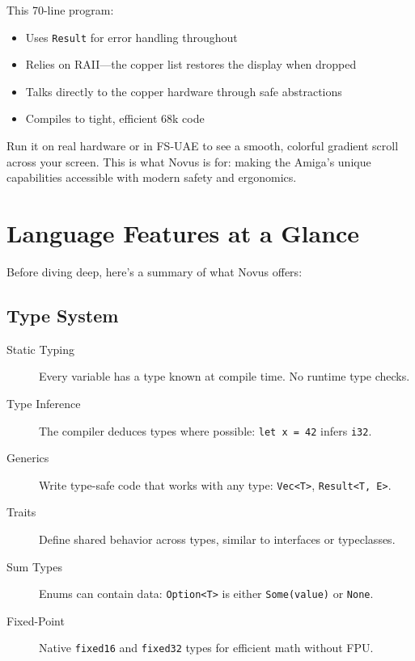 This 70-line program:

\begin{itemize}
    \item Uses \texttt{Result} for error handling throughout
    \item Relies on RAII---the copper list restores the display when dropped
    \item Talks directly to the copper hardware through safe abstractions
    \item Compiles to tight, efficient 68k code
\end{itemize}

Run it on real hardware or in FS-UAE to see a smooth, colorful gradient scroll across your screen. This is what Novus is for: making the Amiga's unique capabilities accessible with modern safety and ergonomics.

\section{Language Features at a Glance}
\label{sec:features-glance}

Before diving deep, here's a summary of what Novus offers:

\subsection{Type System}

\begin{description}
    \item[Static Typing] Every variable has a type known at compile time. No runtime type checks.
    \item[Type Inference] The compiler deduces types where possible: \texttt{let x = 42} infers \texttt{i32}.
    \item[Generics] Write type-safe code that works with any type: \texttt{Vec<T>}, \texttt{Result<T, E>}.
    \item[Traits] Define shared behavior across types, similar to interfaces or typeclasses.
    \item[Sum Types] Enums can contain data: \texttt{Option<T>} is either \texttt{Some(value)} or \texttt{None}.
    \item[Fixed-Point] Native \texttt{fixed16} and \texttt{fixed32} types for efficient math without FPU.
\end{description}

